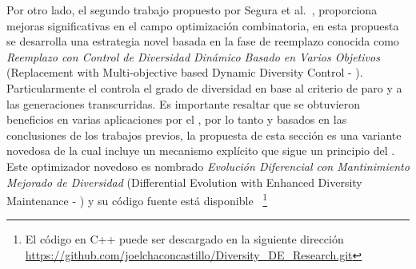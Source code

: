 %
Por otro lado, el segundo trabajo propuesto por Segura et al.~\cite{segura2016novel}, proporciona mejoras significativas en el campo optimización combinatoria, en esta propuesta se desarrolla una estrategia novel basada en la fase de reemplazo conocida como \textit{Reemplazo con Control de Diversidad Dinámico Basado en Varios Objetivos} (Replacement with Multi-objective based Dynamic Diversity Control - \RMDDC{}).
%
Particularmente el \RMDDC{} controla el grado de diversidad en base al criterio de paro y a las generaciones transcurridas.
%
Es importante resaltar que se obtuvieron beneficios en varias aplicaciones por el \RMDDC{}, por lo tanto y basados en las conclusiones de los trabajos previos, la propuesta de esta sección es una variante novedosa de \DE{} la cual incluye un mecanismo explícito que sigue un principio del \RMDDC{}.
%
Este optimizador novedoso es nombrado \textit{Evolución Diferencial con Mantinimiento Mejorado de Diversidad} (Differential Evolution with Enhanced Diversity Maintenance - \DEEDM{}) y su código fuente está disponible ~\footnote{El código en C++ puede ser descargado en la siguiente dirección \url{https://github.com/joelchaconcastillo/Diversity\_DE\_Research.git} }


